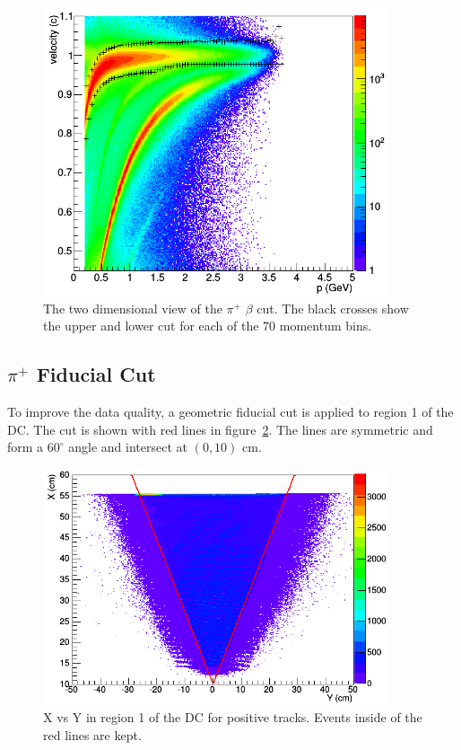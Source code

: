 \begin{figure}[htp]
\centering
\includegraphics[width=4in]{figures/pip_vvpCut.png}
\caption{The two dimensional view of the $\pi^+$ $\beta$ cut. The black crosses show the upper and lower cut for each of the 70 momentum bins.}
\label{fig:pip_vvpCut}
\end{figure}
%
\subsection{$\pi^+$ Fiducial Cut}
To improve the data quality, a geometric fiducial cut is applied to region 1 of the DC.
The cut is shown with red lines in figure~\ref{fig:pip_R1cut_s4}.
The lines are symmetric and form a $60^\circ$ angle and intersect at $(0, 10)$ cm.
\begin{figure}[htp]
\centering
\includegraphics[width=4in]{figures/pip_R1cut_s4.png}
\caption{X vs Y in region 1 of the DC for positive tracks. Events inside of the red lines are kept.}
\label{fig:pip_R1cut_s4}
\end{figure}
%
%

